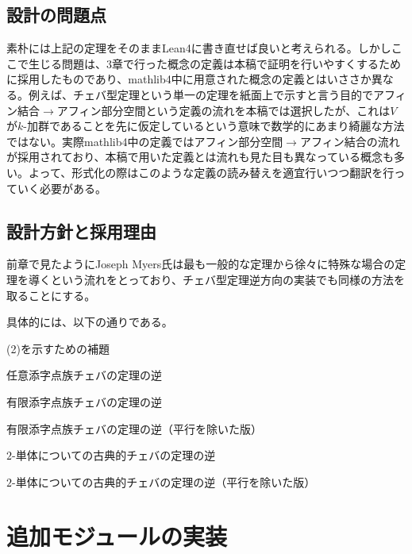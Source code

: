 \documentclass[a4paper,12pt]{bxjsbook}
\newlength{\customindent}
\newenvironment{body}{
  \par
  \begingroup
  \setlength{\leftskip}{\customindent}
  \setlength{\rightskip}{0pt}
  \setlength{\parindent}{1em}
  \setlength{\displayindent}{\customindent}
  \setlength{\displaywidth}{\dimexpr\linewidth-\customindent\relax}
}{
  \par
  \endgroup
}
\theoremstyle{theorem}
\begin{document}
    \subsection{設計の問題点}
    \begin{body}
        \indent 素朴には上記の定理をそのままLean4に書き直せば良いと考えられる。しかしここで生じる問題は、$3$章で行った概念の定義は本稿で証明を行いやすくするために採用したものであり、mathlib4中に用意された概念の定義とはいささか異なる。例えば、チェバ型定理という単一の定理を紙面上で示すと言う目的でアフィン結合$\to$アフィン部分空間という定義の流れを本稿では選択したが、これは$V$が$k$-加群であることを先に仮定しているという意味で数学的にあまり綺麗な方法ではない。実際mathlib4中の定義ではアフィン部分空間$\to$アフィン結合の流れが採用されており、本稿で用いた定義とは流れも見た目も異なっている概念も多い。よって、形式化の際はこのような定義の読み替えを適宜行いつつ翻訳を行っていく必要がある。
    \end{body}

    \subsection{設計方針と採用理由}
    \begin{body}
        \indent 前章で見たようにJoseph Myers氏は最も一般的な定理から徐々に特殊な場合の定理を導くという流れをとっており、チェバ型定理逆方向の実装でも同様の方法を取ることにする。

        \indent 具体的には、以下の通りである。

        \begin{bodyenumerate}
            \item (2)を示すための補題
            \item 任意添字点族チェバの定理の逆
            \item 有限添字点族チェバの定理の逆
            \item 有限添字点族チェバの定理の逆（平行を除いた版）
            \item $2$-単体についての古典的チェバの定理の逆
            \item $2$-単体についての古典的チェバの定理の逆（平行を除いた版）
        \end{bodyenumerate}


    \end{body}

    \section{追加モジュールの実装}
\end{document}
